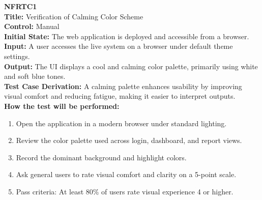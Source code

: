 \documentclass[12pt, titlepage]{article}
\begin{document}
\textbf{NFRTC1}\\
\textbf{Title:} Verification of Calming Color Scheme\\
\textbf{Control:} Manual\\
\textbf{Initial State:} The web application is deployed and accessible from a browser.\\
\textbf{Input:} A user accesses the live system on a browser under default theme settings.\\
\textbf{Output:} The UI displays a cool and calming color palette, primarily using white and soft blue tones.\\
\textbf{Test Case Derivation:} A calming palette enhances usability by improving visual comfort and reducing fatigue, making it easier to interpret outputs.\\
\textbf{How the test will be performed:}
\begin{enumerate}
  \item Open the application in a modern browser under standard lighting.
  \item Review the color palette used across login, dashboard, and report views.
  \item Record the dominant background and highlight colors.
  \item Ask general users to rate visual comfort and clarity on a 5-point scale.
  \item Pass criteria: At least 80\% of users rate visual experience 4 or higher.
\end{enumerate}

\vspace{1em}
\end{document}
